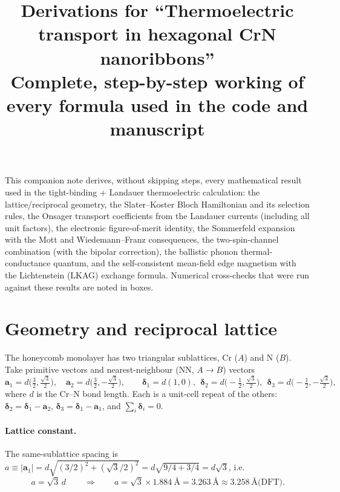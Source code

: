\documentclass[11pt]{article}
\title{Derivations for ``Thermoelectric transport in hexagonal CrN nanoribbons''\\
\large Complete, step-by-step working of every formula used in the code and manuscript}
\author{}
\date{}
\begin{document}
\maketitle
\noindent
This companion note derives, without skipping steps, every mathematical result used in the
tight-binding + Landauer thermoelectric calculation: the lattice/reciprocal geometry, the
Slater--Koster Bloch Hamiltonian and its selection rules, the Onsager transport coefficients from
the Landauer currents (including all unit factors), the electronic figure-of-merit identity, the
Sommerfeld expansion with the Mott and Wiedemann--Franz consequences, the two-spin-channel
combination (with the bipolar correction), the ballistic phonon thermal-conductance quantum, and
the self-consistent mean-field edge magnetism with the Lichtenstein (LKAG) exchange formula.
Numerical cross-checks that were run against these results are noted in boxes.

\tableofcontents

\section{Geometry and reciprocal lattice}

The honeycomb monolayer has two triangular sublattices, Cr ($A$) and N ($B$). Take primitive
vectors and nearest-neighbour (NN, $A\!\to\!B$) vectors
\begin{equation}
\mathbf a_1 = d\Big(\tfrac32,\tfrac{\sqrt3}{2}\Big),\quad
\mathbf a_2 = d\Big(\tfrac32,-\tfrac{\sqrt3}{2}\Big),\qquad
\boldsymbol\delta_1 = d(1,0),\ \
\boldsymbol\delta_2 = d\big(-\tfrac12,\tfrac{\sqrt3}{2}\big),\ \
\boldsymbol\delta_3 = d\big(-\tfrac12,-\tfrac{\sqrt3}{2}\big),
\end{equation}
where $d$ is the Cr--N bond length. Each is a unit-cell repeat of the others:
$\boldsymbol\delta_2=\boldsymbol\delta_1-\mathbf a_2$, $\boldsymbol\delta_3=\boldsymbol\delta_1-\mathbf a_1$,
and $\sum_i\boldsymbol\delta_i=0$.

\paragraph{Lattice constant.} The same-sublattice spacing is
$a\equiv|\mathbf a_1| = d\sqrt{(3/2)^2+(\sqrt3/2)^2} = d\sqrt{9/4+3/4}=d\sqrt3$, i.e.
\begin{equation}
\boxed{\,a=\sqrt3\,d\,}\qquad\Rightarrow\qquad
a=\sqrt3\times1.884~\text{\AA}=3.263~\text{\AA}\approx3.258~\text{\AA (DFT)}.
\end{equation}
\end{document}
